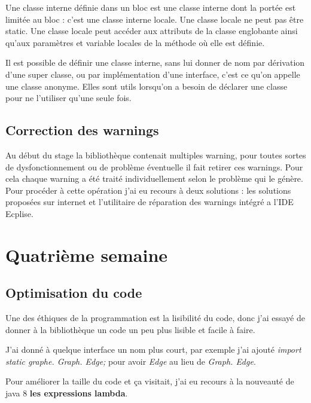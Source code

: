 \documentclass[12pt]{report}
\begin{document}
Une classe interne définie dans un bloc est une classe interne dont la portée est limitée au bloc : c’est une classe interne locale. Une classe locale ne peut pas être static. Une classe locale peut accéder aux attributs de la classe englobante ainsi qu'aux paramètres et variable locales de la méthode où elle est définie.\newline 

Il est possible de définir une classe interne, sans lui donner de nom par dérivation d'une super classe, ou par implémentation d’une interface, c'est ce qu'on appelle une classe anonyme. Elles sont utils lorsqu'on a besoin de déclarer une classe pour ne l'utiliser qu'une seule fois.\newline


\subsection{Correction des warnings}

Au début du stage la bibliothèque contenait multiples warning, pour toutes sortes de dysfonctionnement ou de problème éventuelle il fait retirer ces warnings. Pour cela chaque warning a été traité individuellement selon le problème qui le génère. Pour procéder à cette opération j'ai eu recours à deux solutions : les solutions proposées sur internet et l'utilitaire de réparation des warnings intégré a l'IDE Ecplise.
~\\

\section{Quatrième semaine}

\subsection{Optimisation du code}

Une des éthiques de la programmation est la lisibilité du code, donc j'ai essayé de donner à la bibliothèque un code un peu plus lisible et facile à faire. \newline

J'ai donné à quelque interface un nom plus court, par exemple j'ai ajouté \textit{import static graphe. Graph. Edge;} pour avoir \textit{Edge} au lieu de \textit{Graph. Edge}.\newline

Pour améliorer la taille du code et ça visitait, j'ai eu recours à la nouveauté de java 8 \textbf{les expressions lambda}.
\end{document}
